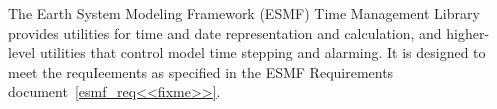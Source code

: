 

The Earth System Modeling Framework (ESMF) Time Management Library
provides utilities for time and date representation and calculation,
and higher-level utilities that control model time stepping and alarming.
It is designed to meet the requIeements as specified in the ESMF 
Requirements document~\ref{esmf_req<<fixme>>}.

